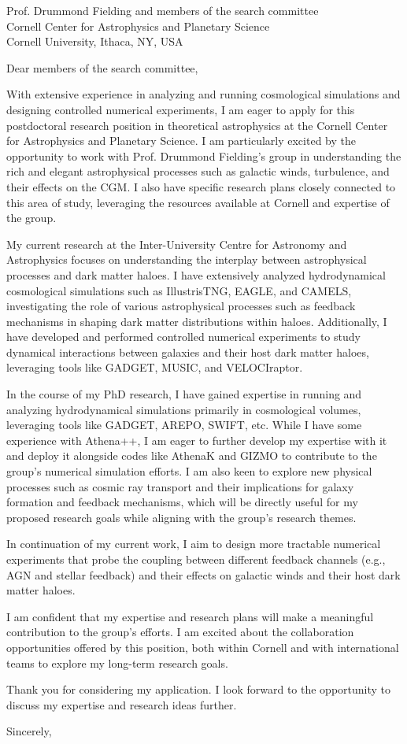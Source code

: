 \documentclass[11pt]{letter}
\begin{document}
\begin{letter}{Prof. Drummond Fielding and members of the search committee \\ Cornell Center for Astrophysics and Planetary Science \\ Cornell University, Ithaca, NY, USA}

\opening{Dear members of the search committee,}

With extensive experience in analyzing and running cosmological simulations and designing controlled numerical experiments, I am eager to apply for this postdoctoral research position in theoretical astrophysics at the Cornell Center for Astrophysics and Planetary Science. I am particularly excited by the opportunity to work with Prof. Drummond Fielding's group in understanding the rich and elegant astrophysical processes such as galactic winds, turbulence, and their effects on the CGM. I also have specific research plans closely connected to this area of study, leveraging the resources available at Cornell and expertise of the group.

My current research at the Inter-University Centre for Astronomy and Astrophysics focuses on understanding the interplay between astrophysical processes and dark matter haloes. I have extensively analyzed hydrodynamical cosmological simulations such as IllustrisTNG, EAGLE, and CAMELS, investigating the role of various astrophysical processes such as feedback mechanisms in shaping dark matter distributions within haloes. Additionally, I have developed and performed controlled numerical experiments to study dynamical interactions between galaxies and their host dark matter haloes, leveraging tools like GADGET, MUSIC, and VELOCIraptor.  

In the course of my PhD research, I have gained expertise in running and analyzing hydrodynamical simulations primarily in cosmological volumes, leveraging tools like GADGET, AREPO, SWIFT, etc. While I have some experience with Athena++, I am eager to further develop my expertise with it and deploy it  alongside codes like AthenaK and GIZMO to contribute to the group's numerical simulation efforts. I am also keen to explore new physical processes such as cosmic ray transport and their implications for galaxy formation and feedback mechanisms, which will be directly useful for my proposed research goals while aligning with the group's research themes.

In continuation of my current work, I aim to design more tractable numerical experiments that probe the coupling between different feedback channels (e.g., AGN and stellar feedback) and their effects on galactic winds and their host dark matter haloes.  

I am confident that my expertise and research plans will make a meaningful contribution to the group's efforts. I am excited about the collaboration opportunities offered by this position, both within Cornell and with international teams to explore my long-term research goals.

Thank you for considering my application. I look forward to the opportunity to discuss my expertise and research ideas further.  

\closing{Sincerely,}

\end{letter}
\end{document}
